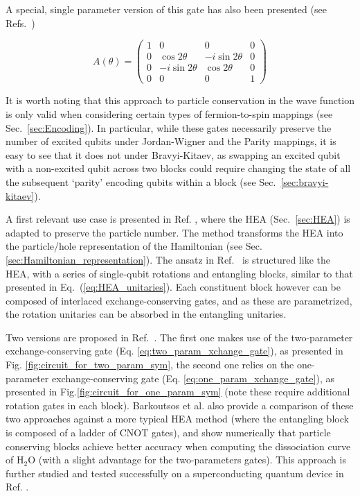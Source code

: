 A special, single parameter version of this gate has also been presented (see Refs.~\cite{McKay2016, Sagastizabal2019})

\begin{equation}\label{eq:one_param_xchange_gate}
    A(\theta) =
    \begin{pmatrix}
    1& 0 & 0 & 0 \\
    0 & \cos2\theta & -i\sin2\theta & 0\\
    0 & -i\sin2\theta & \cos2\theta  & 0 \\
    0 & 0 & 0 & 1
    \end{pmatrix}
\end{equation}

It is worth noting that this approach to particle conservation in the wave function is only valid when considering certain types of fermion-to-spin mappings (see Sec.~\ref{sec:Encoding}). In particular, while these gates necessarily preserve the number of excited qubits under Jordan-Wigner \cite{Gard2020} and the Parity mappings, it is easy to see that it does not under Bravyi-Kitaev, as swapping an excited qubit with a non-excited qubit across two blocks could require changing the state of all the subsequent `parity' encoding qubits within a block (see Sec.~\ref{sec:bravyi-kitaev}).

A first relevant use case is presented in Ref. \cite{Barkoutsos2018}, where the HEA (Sec.~\ref{sec:HEA}) is adapted to preserve the particle number. The method transforms the HEA into the particle/hole representation of the Hamiltonian (see Sec. \ref{sec:Hamiltonian_representation}). The ansatz in Ref.~\cite{Barkoutsos2018} is structured like the HEA, with a series of single-qubit rotations and entangling blocks, similar to that presented in Eq.~(\ref{eq:HEA_unitaries}). Each constituent block however can be composed of interlaced exchange-conserving gates, and as these are parametrized, the rotation unitaries can be absorbed in the entangling unitaries.

Two versions are proposed in Ref.~\cite{Barkoutsos2018}. The first one makes use of the two-parameter exchange-conserving gate (Eq. \ref{eq:two_param_xchange_gate}), as presented in Fig. \ref{fig:circuit_for_two_param_sym}, the second one relies on the one-parameter exchange-conserving gate (Eq. \ref{eq:one_param_xchange_gate}), as presented in Fig.\ref{fig:circuit_for_one_param_sym} (note these require additional rotation gates in each block). Barkoutsos et al. \cite{Barkoutsos2018} also provide a comparison of these two approaches against a more typical HEA method (where the entangling block is composed of a ladder of CNOT gates), and show numerically that particle conserving blocks achieve better accuracy when computing the dissociation curve of $\mathrm{H_2O}$ (with a slight advantage for the two-parameters gates). This approach is further studied and tested successfully on a superconducting quantum device in Ref. \cite{Ganzhorn2019}.

